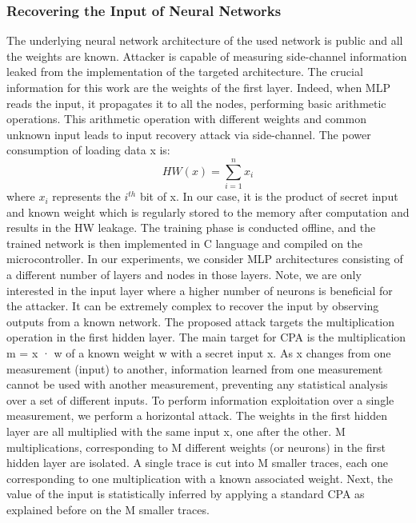 \subsubsection{Recovering the Input of Neural Networks}
The underlying neural network architecture of the used
network is public and all the weights are known.
Attacker is capable of measuring side-channel information
leaked from the implementation of the targeted architecture.
The crucial information for this work are the weights of the
first layer. Indeed, when MLP reads the input, it propagates it to all the nodes, performing basic arithmetic operations.
This arithmetic operation with different weights and common
unknown input leads to input recovery attack via side-channel.
The power consumption of loading data x is: 
$$HW(x) = \sum_{i=1}^{n} {x_i}$$
where \(x_i\) represents the \(i^{th}\) bit of x.
In our case, it is the product of secret input and known weight which is regularly stored to the memory after computation and results in the HW leakage.
\newline
The training phase is conducted offline, and the trained
network is then implemented in C language and compiled on
the microcontroller. In our experiments, we consider MLP architectures consisting of a different number of layers and nodes in those layers. Note, we are only interested in the input layer where a higher number of neurons is beneficial for the attacker. It can be extremely complex to recover the input by observing outputs from a known network. The proposed attack targets the multiplication operation in
the first hidden layer. The main target for CPA is the multiplication m = x · w of a known weight w with a secret input x. As x changes from one measurement (input) to another, information learned from one measurement cannot be used with another measurement, preventing any statistical analysis over a set of different inputs. 
\newline
To perform information exploitation over a single
measurement, we perform a horizontal attack. The weights in the first hidden layer are all multiplied with the
same input x, one after the other. M multiplications, corresponding to M different weights (or
neurons) in the first hidden layer are isolated.
A single trace is cut into M smaller traces, each one
corresponding to one multiplication with a known associated
weight. Next, the value of the input is statistically inferred by applying a standard CPA as explained before on the M smaller traces.

